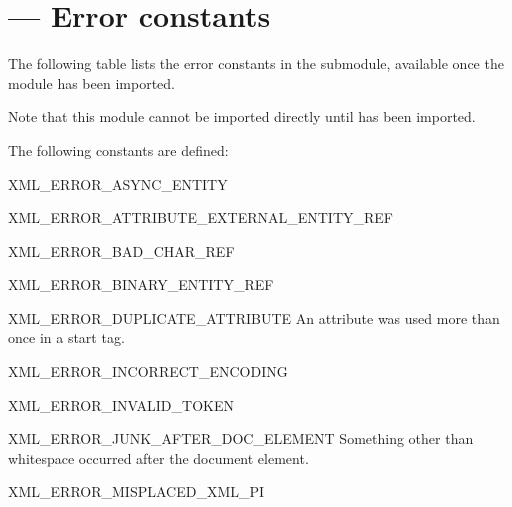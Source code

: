 \section{ --- Error constants}


The following table lists the error constants in the
 submodule, available once the
 module has been imported.

Note that this module cannot be imported directly until
 has been imported.

The following constants are defined:

\begin{datadesc}{XML_ERROR_ASYNC_ENTITY}
\end{datadesc}

\begin{datadesc}{XML_ERROR_ATTRIBUTE_EXTERNAL_ENTITY_REF}
\end{datadesc}

\begin{datadesc}{XML_ERROR_BAD_CHAR_REF}
\end{datadesc}

\begin{datadesc}{XML_ERROR_BINARY_ENTITY_REF}
\end{datadesc}

\begin{datadesc}{XML_ERROR_DUPLICATE_ATTRIBUTE}
An attribute was used more than once in a start tag.
\end{datadesc}

\begin{datadesc}{XML_ERROR_INCORRECT_ENCODING}
\end{datadesc}

\begin{datadesc}{XML_ERROR_INVALID_TOKEN}
\end{datadesc}

\begin{datadesc}{XML_ERROR_JUNK_AFTER_DOC_ELEMENT}
Something other than whitespace occurred after the document element.
\end{datadesc}

\begin{datadesc}{XML_ERROR_MISPLACED_XML_PI}
\end{datadesc}

